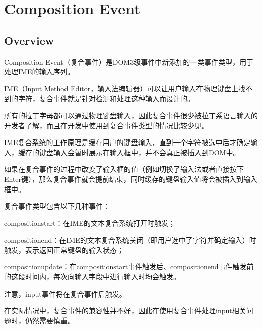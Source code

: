 \part{Composition Event}

\chapter{Overview}


Composition Event（复合事件）是DOM3级事件中新添加的一类事件类型，用于处理IME的输入序列。

IME（Input Method Editor，输入法编辑器）可以让用户输入在物理键盘上找不到的字符，复合事件就是针对检测和处理这种输入而设计的。

所有的拉丁字母都可以通过物理键盘输入，因此复合事件很少被拉丁系语言输入的开发者了解，而且在开发中使用到复合事件类型的情况比较少见。

IME复合系统的工作原理是缓存用户的键盘输入，直到一个字符被选中后才确定输入，缓存的键盘输入会暂时展示在输入框中，并不会真正被插入到DOM中。

如果在复合事件的过程中改变了输入框的值（例如切换了输入法或者直接按下Enter键），那么复合事件就会提前结束，同时缓存的键盘输入值将会被插入到输入框中。

复合事件类型包含以下几种事件：

\begin{compactitem}
\item compositionstart：在IME的文本复合系统打开时触发；
\item compositionend：在IME的文本复合系统关闭（即用户选中了字符并确定输入）时触发，表示返回正常键盘的输入状态；
\item compositionupdate：在compositionstart事件触发后、compositionend事件触发前的这段时间内，每次向输入字段中进行输入时均会触发。
\end{compactitem}

注意，input事件将在复合事件后触发。

在实际情况中，复合事件的兼容性并不好，因此在使用复合事件处理input相关问题时，仍然需要慎重。



